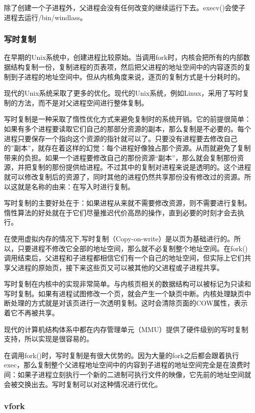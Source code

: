 除了创建一个子进程外，父进程会没有任何改变的继续运行下去。execv()会使子进程去运行/bin/windlass。

\subsubsection{写时复制}

在早期的Unix系统中，创建进程比较原始。当调用fork时，内核会把所有的内部数据结构复制一份，复制进程的页表项，然后把父进程的地址空间中的内容逐页的复制到子进程的地址空间中。但从内核角度来说，逐页的复制方式是十分耗时的。

现代的Unix系统采取了更多的优化。现代的Unix系统，例如Linux，采用了写时复制的方法，而不是对父进程空间进行整体复制。

写时复制是一种采取了惰性优化方式来避免复制时的系统开销。它的前提很简单：如果有多个进程要读取它们自己的那部分资源的副本，那么复制是不必要的。每个进程只要保存一个指向这个资源的指针就可以了。只要没有进程要去修改自己的''副本''，就存在着这样的幻觉：每个进程好像独占那个资源。从而就避免了复制带来的负担。如果一个进程要修改自己的那份资源“副本”，那么就会复制那份资源，并把复制的那份提供给进程。不过其中的复制对进程来说是透明的。这个进程就可以修改复制后的资源了，同时其他的进程仍然共享那份没有修改过的资源。所以这就是名称的由来：在写入时进行复制。

写时复制的主要好处在于：如果进程从来就不需要修改资源，则不需要进行复制。惰性算法的好处就在于它们尽量推迟代价高昂的操作，直到必要的时刻才会去执行。

在使用虚拟内存的情况下,写时复制（Copy-on-write）是以页为基础进行的。所以，只要进程不修改它全部的地址空间，那么就不必复制整个地址空间。在fork()调用结束后，父进程和子进程都相信它们有一个自己的地址空间，但实际上它们共享父进程的原始页，接下来这些页又可以被其他的父进程或子进程共享。

写时复制在内核中的实现非常简单。与内核页相关的数据结构可以被标记为只读和写时复制。如果有进程试图修改一个页，就会产生一个缺页中断。内核处理缺页中断处理的方式就是对该页进行一次透明复制。这时会清除页面的COW属性，表示着它不再被共享。

现代的计算机结构体系中都在内存管理单元（MMU）提供了硬件级别的写时复制支持，所以实现是很容易的。

在调用fork()时，写时复制是有很大优势的。因为大量的fork之后都会跟着执行exec，那么复制整个父进程地址空间中的内容到子进程的地址空间完全是在浪费时间：如果子进程立刻执行一个新的二进制可执行文件的映像，它先前的地址空间就会被交换出去。写时复制可以对这种情况进行优化。

\subsubsection{vfork}

